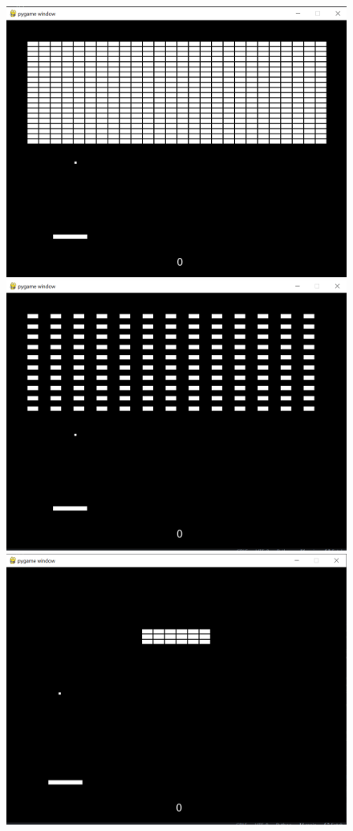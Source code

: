 \documentclass[twoside,11pt]{article}
\begin{document}
\begin{figure}[H]
\includegraphics[scale=0.2]{layout0}
\includegraphics[scale=0.2]{layout1}
\includegraphics[scale=0.2]{layout2}

\end{figure}
\end{document}
